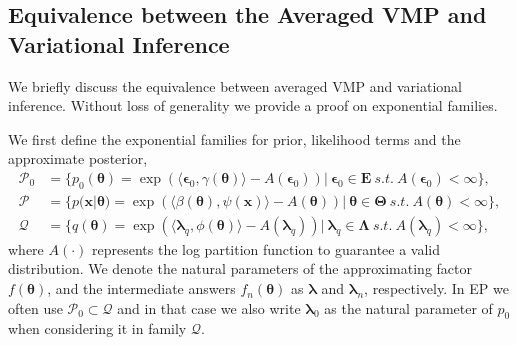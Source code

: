 \documentclass{article} %
\begin{document}
\subsection{Equivalence between the Averaged VMP and Variational Inference}
We briefly discuss the equivalence between averaged VMP and variational inference.  
%
Without loss of generality we provide a proof on exponential families. 

We first define the exponential families for prior, likelihood terms and the approximate posterior,
\begin{align}
\mathcal{P}_0 &= \{p_0(\bm{\theta}) = \exp \left( \langle \bm{\epsilon}_0, \gamma(\bm{\theta}) \rangle - A(\bm{\epsilon}_0) \right) |\ \bm{\epsilon}_0 \in \bm{E} \ s.t.~ A(\bm{\epsilon}_0) < \infty \}, \\
\mathcal{P} &= \{p(\bm{x} | \bm{\theta}) = \exp \left( \langle \beta(\bm{\theta}), \psi(\bm{x}) \rangle - A(\bm{\theta}) \right) |\ \bm{\theta} \in \bm{\Theta} \ s.t.~ A(\bm{\theta}) < \infty \}, \\
\mathcal{Q} &= \{q(\bm{\theta}) = \exp \left( \langle \bm{\lambda}_q, \phi(\bm{\theta}) \rangle - A(\bm{\lambda}_q) \right) |\ \bm{\lambda}_q \in \bm{\Lambda} \ s.t.~ A(\bm{\lambda}_q) < \infty \},
\end{align}
where $A(\cdot)$ represents the log partition function to guarantee a valid distribution. We denote the natural parameters of the approximating factor $f(\bm{\theta})$, and the intermediate answers $f_n(\bm{\theta})$ as $\bm{\lambda}$ and $\bm{\lambda}_n$, respectively. In EP we often use $\mathcal{P}_0 \subset \mathcal{Q}$ and in that case we also write $\bm{\lambda}_0$ as the natural parameter of $p_0$ when considering it in family $\mathcal{Q}$.
\end{document}
